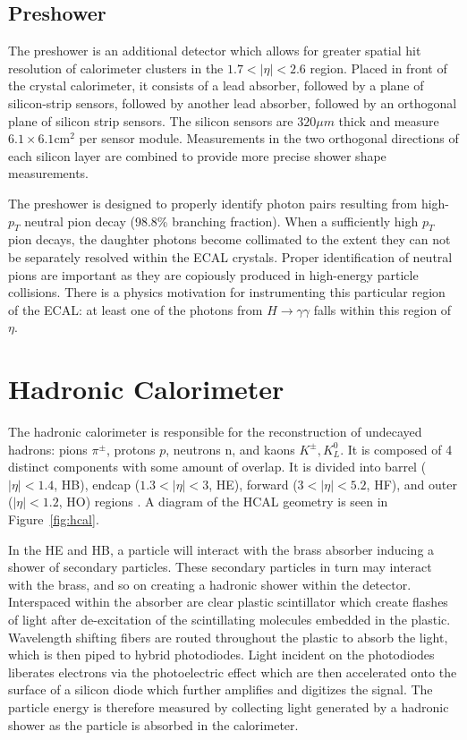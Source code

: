 \subsection{Preshower}

The preshower is an additional detector which allows for greater spatial hit resolution of calorimeter clusters in the $1.7<|\eta|<2.6$ region. Placed in front of the crystal calorimeter, it consists of a lead absorber, followed by a plane of silicon-strip sensors, followed by another lead absorber, followed by an orthogonal plane of silicon strip sensors. The silicon sensors are $320\mu m$ thick and measure $6.1\times6.1\textrm{cm}^{2}$ per sensor module. Measurements in the two orthogonal directions of each silicon layer are combined to provide more precise shower shape measurements.

The preshower is designed to properly identify photon pairs resulting from high-$p_{T}$ neutral pion decay (98.8\% branching fraction). When a sufficiently high $p_{T}$ pion decays, the daughter photons become collimated to the extent they can not be separately resolved within the ECAL crystals. Proper identification of neutral pions are important as they are copiously produced in high-energy particle collisions. There is a physics motivation for instrumenting this particular region of the ECAL: at least one of the photons from $H\rightarrow\gamma\gamma$ falls within this region of $\eta$. 

\section{Hadronic Calorimeter}

The hadronic calorimeter is responsible for the reconstruction of undecayed hadrons: pions $\pi^{\pm}$, protons $p$, neutrons n, and kaons $K^{\pm}, K^{0}_{L}$. It is composed of 4 distinct components with some amount of overlap. It is divided into barrel ($|\eta|<1.4$, HB), endcap ($1.3<|\eta|<3$, HE), forward ($3<|\eta|<5.2$, HF), and outer ($|\eta|<1.2$, HO) regions  \cite{hcaltdr}. A diagram of the HCAL geometry is seen in Figure~\ref{fig:hcal}.

In the HE and HB, a particle will interact with the brass absorber inducing a shower of secondary particles. These secondary particles in turn may interact with the brass, and so on creating a hadronic shower within the detector. Interspaced within the absorber are clear plastic scintillator which create flashes of light after de-excitation of the scintillating molecules embedded in the plastic. Wavelength shifting fibers are routed throughout the plastic to absorb the light, which is then piped to hybrid photodiodes. Light incident on the photodiodes liberates electrons via the photoelectric effect which are then accelerated onto the surface of a silicon diode which further amplifies and digitizes the signal. The particle energy is therefore measured by collecting light generated by a hadronic shower as the particle is absorbed in the calorimeter.

